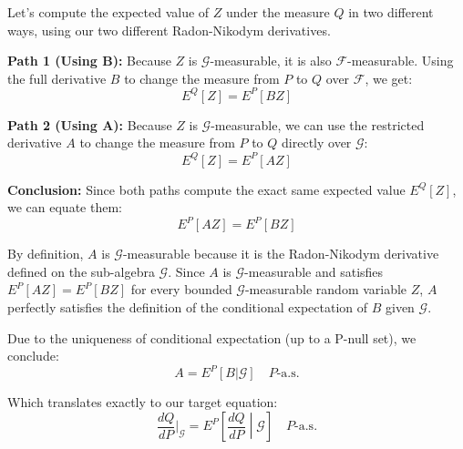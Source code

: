 Let's compute the expected value of $Z$ under the measure $Q$ in two different ways, using our two different Radon-Nikodym derivatives.

\textbf{Path 1 (Using B):} 
Because $Z$ is $\mathcal{G}$-measurable, it is also $\mathcal{F}$-measurable. Using the full derivative $B$ to change the measure from $P$ to $Q$ over $\mathcal{F}$, we get:
$$ E^Q[Z] = E^P[B Z] $$

\textbf{Path 2 (Using A):}
Because $Z$ is $\mathcal{G}$-measurable, we can use the restricted derivative $A$ to change the measure from $P$ to $Q$ directly over $\mathcal{G}$:
$$ E^Q[Z] = E^P[A Z] $$

\textbf{Conclusion:}
Since both paths compute the exact same expected value $E^Q[Z]$, we can equate them:
$$ E^P[A Z] = E^P[B Z] $$

By definition, $A$ is $\mathcal{G}$-measurable because it is the Radon-Nikodym derivative defined on the sub-algebra $\mathcal{G}$. 
Since $A$ is $\mathcal{G}$-measurable and satisfies $E^P[A Z] = E^P[B Z]$ for every bounded $\mathcal{G}$-measurable random variable $Z$, $A$ perfectly satisfies the definition of the conditional expectation of $B$ given $\mathcal{G}$. 

Due to the uniqueness of conditional expectation (up to a P-null set), we conclude:
$$ A = E^P[B | \mathcal{G}] \quad P\text{-a.s.} $$

Which translates exactly to our target equation:
$$ \frac{dQ}{dP}\bigg|_{\mathcal{G}} = E^P\left[\frac{dQ}{dP} \middle| \mathcal{G}\right] \quad P\text{-a.s.} $$